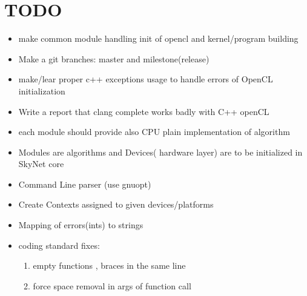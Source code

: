 \documentclass[a4paper,10pt]{article}
\begin{document}
\section{TODO}
\begin{itemize}
\item make common module handling init of opencl and kernel/program building
\item Make a git branches: master and milestone(release)
\item make/lear proper c++ exceptions usage to handle errors of OpenCL initialization
\item Write a report that clang complete works badly with C++ openCL
\item each module should provide also CPU plain implementation of algorithm
\item Modules are algorithms and Devices( hardware layer) are to be initialized in SkyNet core
\item Command Line parser (use gnuopt)
\item Create Contexts assigned to given devices/platforms
\item Mapping of errors(ints) to strings
\item coding standard fixes:
\begin{enumerate}
\item empty functions , braces in the same line
\item force space removal in args of function call
\end{enumerate}
\end{itemize}
\end{document}
